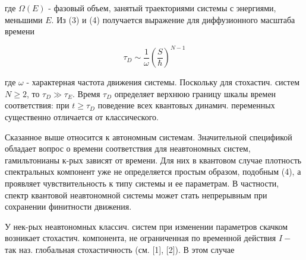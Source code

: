 \documentclass[10pt]{article}
\begin{document}
где $\Omega(E)$ - фазовый объем, занятый траекториями системы с энергиями, меньшими $E$. Из (3) и (4) получается выражение для диффузионного масштаба времени



\[

\tau_{D} \sim \frac{1}{\omega}\left(\frac{S}{\hbar}\right)^{N-1}

\]



где $\omega$ - характерная частота движения системы. Поскольку для стохастич. систем $N \geqslant 2$, то $\tau_{D} \gg \tau_{E}$. Время $\tau_{D}$ определяет верхнюю границу шкалы времен соответствия: при $t \geqslant \tau_{D}$ поведение всех квантовых динамич. переменных существенно отличается от классического.



Сказанное выше относится к автономным системам. Значительной спецификой обладает вопрос о времени соответствия для неавтономных систем, гамильтонианы к-рых зависят от времени. Для них в квантовом случае плотность спектральных компонент уже не определяется простым образом, подобным (4), а проявляет чувствительность к типу системы и ее параметрам. В частности, спектр квантовой неавтономной системы может стать непрерывным при сохранении финитности движения.



У нек-рых неавтономных классич. систем при изменении параметров скачком возникает стохастич. компонента, не ограниченная по временной действия $I-$ так наз. глобальная стохастичность (см. [1], [2]). В этом случае
\end{document}
